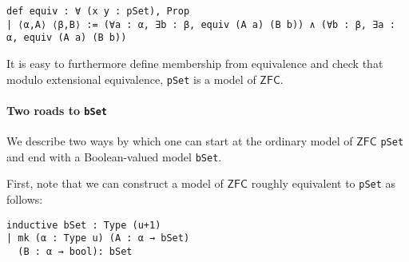 \documentclass[sigplan,10pt,review, anonymous]{acmart}
\theoremstyle{definition}
\begin{document}
\begin{lstlisting}[basicstyle=\ttfamily\small]
def equiv : ∀ (x y : pSet), Prop
| ⟨α,A⟩ ⟨β,B⟩ := (∀a : α, ∃b : β, equiv (A a) (B b)) ∧ (∀b : β, ∃a : α, equiv (A a) (B b))
\end{lstlisting}

It is easy to furthermore define membership from equivalence and check that modulo extensional equivalence, \lstinline{pSet} is a model of \(\mathsf{ZFC}\).

\paragraph{Two roads to \lstinline{bSet}} We describe two ways by which one can start at the ordinary model of \(\mathsf{ZFC}\) \lstinline{pSet} and end with a Boolean-valued model \lstinline{bSet}.

First, note that we can construct a model of \(\mathsf{ZFC}\) roughly equivalent to \lstinline{pSet} as follows:

\begin{lstlisting}[breaklines, basicstyle=\ttfamily\small]
inductive bSet : Type (u+1)
| mk (α : Type u) (A : α → bSet)
  (B : α → bool): bSet
\end{lstlisting}
\end{document}
